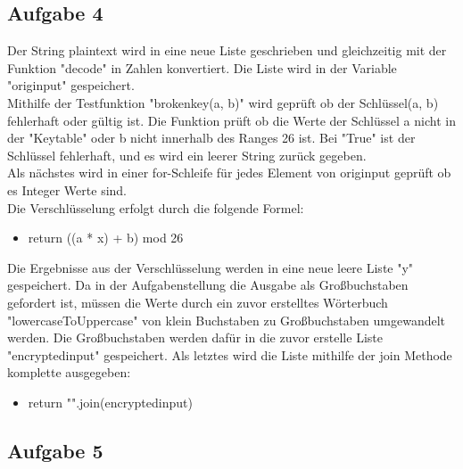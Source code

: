 \documentclass[12pt]{article}
\begin{document}
\begin{spacing}{}
\subsection{Aufgabe 4}

Der String plain\textunderscore text wird in eine neue Liste geschrieben und gleichzeitig mit der Funktion "decode" in Zahlen konvertiert. Die Liste wird in der Variable "orig\textunderscore input" gespeichert.\\
Mithilfe der Testfunktion "broken\textunderscore key(a, b)" wird geprüft ob der Schlüssel(a, b) fehlerhaft oder gültig ist. Die Funktion prüft ob die Werte der Schlüssel a nicht in der "Key\textunderscore table" oder b nicht innerhalb des Ranges 26 ist. Bei "True" ist der Schlüssel fehlerhaft, und es wird ein leerer String zurück gegeben.\\
Als nächstes wird in einer for-Schleife für jedes Element von orig\textunderscore input geprüft ob es Integer Werte sind.\\

Die Verschlüsselung erfolgt durch die folgende Formel: 
\begin{itemize}
\item return ((a * x) + b) mod 26
\end{itemize}
Die Ergebnisse aus der Verschlüsselung werden in eine neue leere Liste "y" gespeichert. Da in der Aufgabenstellung die Ausgabe als Großbuchstaben gefordert ist, müssen die Werte durch ein zuvor erstelltes Wörterbuch "lowercaseToUppercase" von klein Buchstaben zu Großbuchstaben umgewandelt werden. Die Großbuchstaben werden dafür in die zuvor erstelle Liste "encrypted\textunderscore input" gespeichert. Als letztes wird die Liste mithilfe der join Methode komplette ausgegeben:
\begin{itemize}
\item return "".join(encrypted\textunderscore input)
\end{itemize}

\subsection{Aufgabe 5}


\end{spacing}
\end{document}
